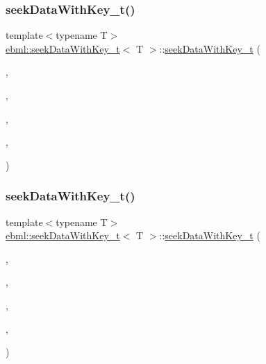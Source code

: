 \subsubsection{\texorpdfstring{seek\+Data\+With\+Key\+\_\+t()}{seekDataWithKey\_t()}\hspace{0.1cm}{\footnotesize\ttfamily [1/6]}}
{\footnotesize\ttfamily template$<$typename T$>$ \\
\mbox{\hyperlink{classebml_1_1seekDataWithKey__t}{ebml\+::seek\+Data\+With\+Key\+\_\+t}}$<$ T $>$\+::\mbox{\hyperlink{classebml_1_1seekDataWithKey__t}{seek\+Data\+With\+Key\+\_\+t}} (\begin{DoxyParamCaption}\item[{\mbox{\hyperlink{namespaceebml_a86c5f604ddf12a74aa9812e997a58691}{ebml\+I\+D\+\_\+t}}}]{,  }\item[{off\+\_\+t}]{,  }\item[{\mbox{\hyperlink{namespaceebml_a2ccdfb60b23efb51fe07f9d066e23604}{vint\+Width\+\_\+t}}}]{,  }\item[{size\+\_\+t}]{,  }\item[{const T \&}]{ }\end{DoxyParamCaption})}

\mbox{\label{classebml_1_1seekDataWithKey__t_abe19a3272fbe18811c86e08cb0eba108}} 
\subsubsection{\texorpdfstring{seek\+Data\+With\+Key\+\_\+t()}{seekDataWithKey\_t()}\hspace{0.1cm}{\footnotesize\ttfamily [2/6]}}
{\footnotesize\ttfamily template$<$typename T$>$ \\
\mbox{\hyperlink{classebml_1_1seekDataWithKey__t}{ebml\+::seek\+Data\+With\+Key\+\_\+t}}$<$ T $>$\+::\mbox{\hyperlink{classebml_1_1seekDataWithKey__t}{seek\+Data\+With\+Key\+\_\+t}} (\begin{DoxyParamCaption}\item[{\mbox{\hyperlink{namespaceebml_a86c5f604ddf12a74aa9812e997a58691}{ebml\+I\+D\+\_\+t}}}]{,  }\item[{off\+\_\+t}]{,  }\item[{\mbox{\hyperlink{namespaceebml_a2ccdfb60b23efb51fe07f9d066e23604}{vint\+Width\+\_\+t}}}]{,  }\item[{size\+\_\+t}]{,  }\item[{T \&\&}]{ }\end{DoxyParamCaption})}

